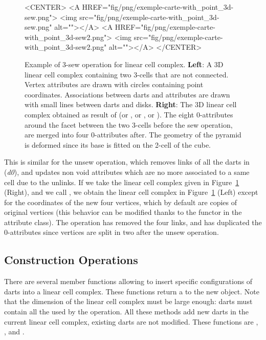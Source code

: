 \begin{figure}
\begin{ccTexOnly}
\begin{center}
    \end{center}
  \end{ccTexOnly}
  \begin{ccHtmlOnly}
    <CENTER>
    <A HREF="fig/png/exemple-carte-with_point_3d-sew.png">
        <img src="fig/png/exemple-carte-with_point_3d-sew.png" alt=""></A>
    <A HREF="fig/png/exemple-carte-with_point_3d-sew2.png">
        <img src="fig/png/exemple-carte-with_point_3d-sew2.png" alt=""></A>
    </CENTER>
    \end{ccHtmlOnly}
    \caption{Example of 3-sew operation for linear cell complex.
      \textbf{Left}: A 3D linear cell complex containing two 3-cells
      that are not connected. Vertex attributes are drawn with circles
      containing point coordinates.  Associations between darts and
      attributes are drawn with small lines between darts and
      disks. \textbf{Right}: The 3D linear cell complex obtained as
      result of  (or , or
      , or ).  The eight
      0-attributes around the facet between the two 3-cells before the
      sew operation, are merged into four 0-attributes after. The
      geometry of the pyramid is deformed since its base is fitted on
      the 2-cell of the cube.}
    \label{fig-lcc-exemple-sew}
\end{figure} 

This is similar for the unsew operation, which removes \betai{} links
of all the darts in
\orbit{\betaun{},\myldots{},\betaimdeux{},\betaipdeux{},\myldots{},\betad{}}(\emph{d0}), 
and updates
non void attributes which are no more associated to a same cell due to
the unlinks.  If we take the linear cell complex given in
Figure~\ref{fig-lcc-exemple-sew} (Right), and we call
, we obtain the linear cell complex in
Figure~\ref{fig-lcc-exemple-sew} (Left) except for the coordinates of
the new four vertices, which by default are copies of original
vertices (this behavior can be modified thanks to the functor
 in the attribute class).  The  operation
has removed the four \betatrois{} links, and has duplicated the 0-attributes
since vertices are split in two after the unsew operation.

\subsection{Construction Operations}\label{ssec-constructions-op}

There are several member functions allowing to insert specific
configurations of darts into a linear cell complex. These functions
return a  to the new object.  Note
that the dimension of the linear cell complex must be large enough:
darts must contain all the \betats{} used by the operation.  All these
methods add new darts in the current linear cell complex, existing
darts are not modified. These functions
are , , 
 and . 

